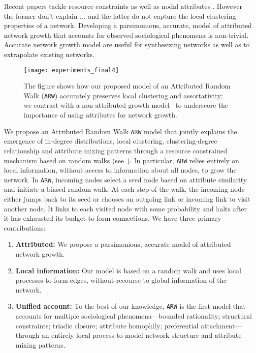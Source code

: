 Recent papers tackle resource constraints  as well as nodal attributes . However the former don't explain ... and the latter do not capture the local clustering properties of a network. Developing a parsimonious, accurate, model of attributed network growth that accounts for observed sociological phenomena is non-trivial. Accurate network growth model are useful for synthesizing networks as well as to extrapolate existing networks.




\begin{figure}[t]
	\centering
	\texttt{[image: experiments\_final4]}
	\caption{The figure shows how our proposed model of an Attributed Random Walk (\texttt{ARW}) accurately preserves local clustering and assortativity; we contrast with a non-attributed growth model~\cite{holme2002growing} to underscore the importance of using attributes for network growth.}
	\label{fig:intro_plot}
\end{figure}


We propose an Attributed Random Walk \texttt{ARW} model that jointly explains
the emergence of in-degree distributions, local clustering, clustering-degree
relationship and attribute mixing patterns through a resource constrained mechanism based on random walks (see~). In particular, \texttt{ARW} relies entirely on local information, without access to information about all nodes, to grow the network. In \texttt{ARW}, incoming nodes select a seed node based on attribute similarity and initiate a biased random walk: At each step of the walk, the incoming node either jumps back to its seed or chooses an outgoing link or incoming link to visit another node. It links to each visited node with some probability and halts after it has exhausted its budget to form connections. We have three primary contributions:
\begin{enumerate}
\item \textbf{Attributed:} We propose a parsimonious, accurate model of attributed network growth.
\item \textbf{Local information:} Our model is based on a random walk and uses local processes to form edges, without recourse to global information of the network.
\item \textbf{Unified account:} To the best of our knowledge, \texttt{ARW} is the first model that accounts for multiple sociological phenomena---bounded rationality; structural constraints; triadic closure; attribute homophily; preferential attachment---through an entirely local process to model network structure and attribute mixing patterns.
\end{enumerate}



